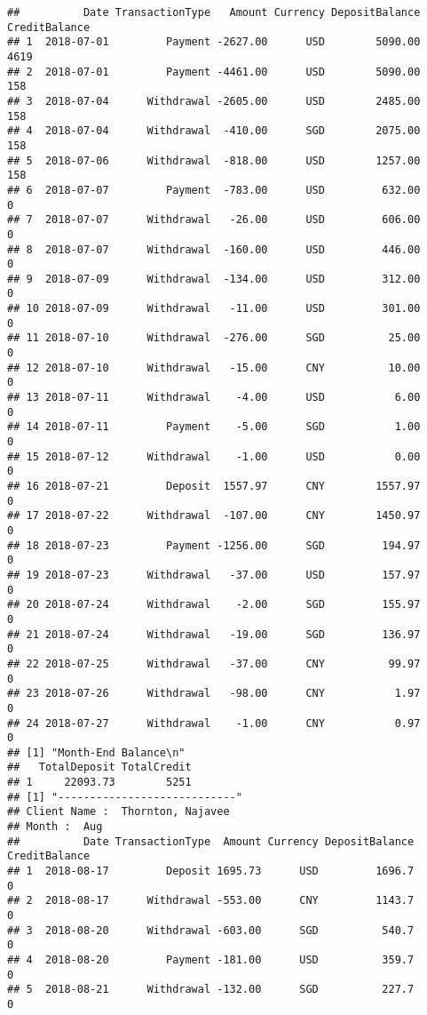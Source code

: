 \documentclass[]{article}
\begin{document}
\begin{verbatim}
##          Date TransactionType   Amount Currency DepositBalance CreditBalance
## 1  2018-07-01         Payment -2627.00      USD        5090.00          4619
## 2  2018-07-01         Payment -4461.00      USD        5090.00           158
## 3  2018-07-04      Withdrawal -2605.00      USD        2485.00           158
## 4  2018-07-04      Withdrawal  -410.00      SGD        2075.00           158
## 5  2018-07-06      Withdrawal  -818.00      USD        1257.00           158
## 6  2018-07-07         Payment  -783.00      USD         632.00             0
## 7  2018-07-07      Withdrawal   -26.00      USD         606.00             0
## 8  2018-07-07      Withdrawal  -160.00      USD         446.00             0
## 9  2018-07-09      Withdrawal  -134.00      USD         312.00             0
## 10 2018-07-09      Withdrawal   -11.00      USD         301.00             0
## 11 2018-07-10      Withdrawal  -276.00      SGD          25.00             0
## 12 2018-07-10      Withdrawal   -15.00      CNY          10.00             0
## 13 2018-07-11      Withdrawal    -4.00      USD           6.00             0
## 14 2018-07-11         Payment    -5.00      SGD           1.00             0
## 15 2018-07-12      Withdrawal    -1.00      USD           0.00             0
## 16 2018-07-21         Deposit  1557.97      CNY        1557.97             0
## 17 2018-07-22      Withdrawal  -107.00      CNY        1450.97             0
## 18 2018-07-23         Payment -1256.00      SGD         194.97             0
## 19 2018-07-23      Withdrawal   -37.00      USD         157.97             0
## 20 2018-07-24      Withdrawal    -2.00      SGD         155.97             0
## 21 2018-07-24      Withdrawal   -19.00      SGD         136.97             0
## 22 2018-07-25      Withdrawal   -37.00      CNY          99.97             0
## 23 2018-07-26      Withdrawal   -98.00      CNY           1.97             0
## 24 2018-07-27      Withdrawal    -1.00      CNY           0.97             0
## [1] "Month-End Balance\n"
##   TotalDeposit TotalCredit
## 1     22093.73        5251
## [1] "----------------------------"
## Client Name :  Thornton, Najavee 
## Month :  Aug 
##          Date TransactionType  Amount Currency DepositBalance CreditBalance
## 1  2018-08-17         Deposit 1695.73      USD         1696.7             0
## 2  2018-08-17      Withdrawal -553.00      CNY         1143.7             0
## 3  2018-08-20      Withdrawal -603.00      SGD          540.7             0
## 4  2018-08-20         Payment -181.00      USD          359.7             0
## 5  2018-08-21      Withdrawal -132.00      SGD          227.7             0

\end{verbatim}
\end{document}

